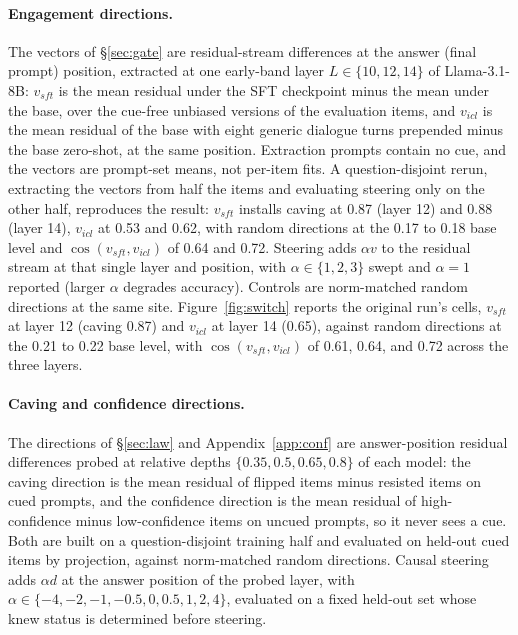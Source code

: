 \documentclass{article}
\begin{document}
\paragraph{Engagement directions.} The vectors of \S\ref{sec:gate} are residual-stream differences at the answer (final prompt) position, extracted at one early-band layer $L \in \{10, 12, 14\}$ of Llama-3.1-8B: $v_{sft}$ is the mean residual under the SFT checkpoint minus the mean under the base, over the cue-free unbiased versions of the evaluation items, and $v_{icl}$ is the mean residual of the base with eight generic dialogue turns prepended minus the base zero-shot, at the same position. Extraction prompts contain no cue, and the vectors are prompt-set means, not per-item fits. A question-disjoint rerun, extracting the vectors from half the items and evaluating steering only on the other half, reproduces the result: $v_{sft}$ installs caving at 0.87 (layer 12) and 0.88 (layer 14), $v_{icl}$ at 0.53 and 0.62, with random directions at the 0.17 to 0.18 base level and $\cos(v_{sft}, v_{icl})$ of 0.64 and 0.72. Steering adds $\alpha v$ to the residual stream at that single layer and position, with $\alpha \in \{1, 2, 3\}$ swept and $\alpha = 1$ reported (larger $\alpha$ degrades accuracy). Controls are norm-matched random directions at the same site. Figure~\ref{fig:switch} reports the original run's cells, $v_{sft}$ at layer 12 (caving 0.87) and $v_{icl}$ at layer 14 (0.65), against random directions at the 0.21 to 0.22 base level, with $\cos(v_{sft}, v_{icl})$ of 0.61, 0.64, and 0.72 across the three layers.

\paragraph{Caving and confidence directions.} The directions of \S\ref{sec:law} and Appendix~\ref{app:conf} are answer-position residual differences probed at relative depths $\{0.35, 0.5, 0.65, 0.8\}$ of each model: the caving direction is the mean residual of flipped items minus resisted items on cued prompts, and the confidence direction is the mean residual of high-confidence minus low-confidence items on uncued prompts, so it never sees a cue. Both are built on a question-disjoint training half and evaluated on held-out cued items by projection, against norm-matched random directions. Causal steering adds $\alpha d$ at the answer position of the probed layer, with $\alpha \in \{-4, -2, -1, -0.5, 0, 0.5, 1, 2, 4\}$, evaluated on a fixed held-out set whose knew status is determined before steering.
\end{document}
